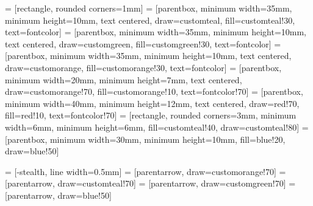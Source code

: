  = [rectangle, rounded corners=1mm] %
 = [parentbox, minimum width=35mm, minimum height=10mm, text centered, draw=customteal, fill=customteal!30, text=fontcolor]
 = [parentbox, minimum width=35mm, minimum height=10mm, text centered, draw=customgreen, fill=customgreen!30, text=fontcolor]
 = [parentbox, minimum width=35mm, minimum height=10mm, text centered, draw=customorange, fill=customorange!30, text=fontcolor]
 = [parentbox, minimum width=20mm, minimum height=7mm, text centered, draw=customorange!70, fill=customorange!10, text=fontcolor!70]
 = [parentbox, minimum width=40mm, minimum height=12mm, text centered, draw=red!70, fill=red!10, text=fontcolor!70]
 = [rectangle, rounded corners=3mm, minimum width=6mm, minimum height=6mm, fill=customteal!40, draw=customteal!80]
 = [parentbox, minimum width=30mm, minimum height=10mm, fill=blue!20, draw=blue!50]

 = [-stealth, line width=0.5mm]
 = [parentarrow, draw=customorange!70]
 = [parentarrow, draw=customteal!70]
 = [parentarrow, draw=customgreen!70]
 = [parentarrow, draw=blue!50]


